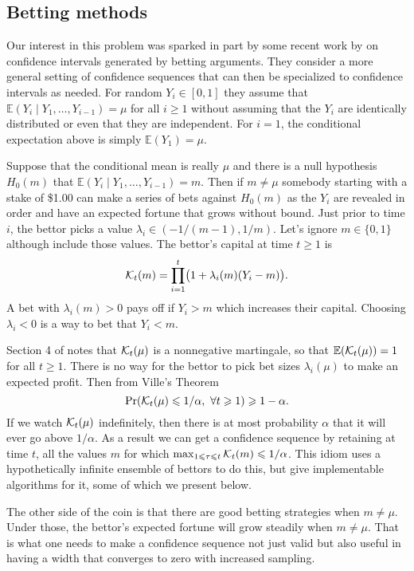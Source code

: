 \documentclass{article}
\newcommand{\art}[1]{\begingroup\color{blue}#1\endgroup}
\renewcommand{\le}{\leqslant}
\renewcommand{\ge}{\geqslant}
\newcommand{\e}{\mathbb{E}}
\newcommand{\giv}{\!\mid\!} %
\begin{document}


\subsection{Betting methods}

Our interest in this problem was sparked in part by some recent
work by \cite{WauRam24a} on confidence intervals generated
by betting arguments.  They consider a more general setting
of confidence sequences that can then be specialized to
confidence intervals as needed.  
For random $Y_i\in[0,1]$ they assume
that $\e(Y_i\giv Y_1,\dots,Y_{i-1})=\mu$ for all $i\ge1$ 
without assuming
that the $Y_i$ are identically distributed or even that
they are independent. For $i=1$, the conditional expectation 
above is simply $\e(Y_1)=\mu$.

Suppose that the conditional mean is really $\mu$ and 
there is a null hypothesis $H_0(m)$ that
$\e(Y_i\giv Y_1,\dots, Y_{i-1})=m$. Then if $m\ne\mu$
somebody starting with a stake of \$1.00 can
make a series of bets against $H_0(m)$
as the $Y_i$ are revealed in order
and have an expected fortune that grows without bound.
Just prior to time $i$, the bettor picks a value
$\lambda_i\in(-1/(m-1),1/m)$. Let's ignore $m\in\{0,1\}$
although \cite{WauRam24a} include those values. The bettor's
capital at time $t\ge1$ is
$$
\mathcal{K}_t(m)= \prod_{i=1}^t\bigl(1+\lambda_i(m)(Y_i-m)\bigr).
$$
A bet with $\lambda_i(m)>0$ pays off if $Y_i>m$ which
increases their capital. Choosing $\lambda_i<0$ is a 
way to bet that $Y_i<m$.

Section 4 of \cite{WauRam24a} notes that $\mathcal{K}_t(\mu)$ is
a \art{nonnegative} martingale, so that $\e(\ck_t(\mu))=1$ for all $t\ge1$.
There is no way for the bettor to pick bet sizes $\lambda_i(\mu)$
to make an expected profit.   \art{Then from Ville's Theorem}
$$
\Pr( \ck_t(\mu)\le 1/\alpha,\ \forall t\ge1)\ge1-\alpha.
$$
If we watch $\mathcal{K}_t(\mu)$ indefinitely, then
there is at most probability $\alpha$ that it will
ever go above $1/\alpha$.  As a result we can get
a confidence sequence by retaining at time $t$,
all the values $m$ for 
which $\max_{1\le\tau\le t}\ck_t(m)\le1/\alpha$.
This idiom uses a hypothetically infinite ensemble of 
bettors to do this, but \cite{WauRam24a} give
implementable algorithms for it, some of which we present below.

The other side of the coin is that there are good betting
strategies when $m\ne\mu$.  Under those, the bettor's expected fortune
will grow steadily when $m\ne\mu$. That is what one needs
to make a confidence sequence not just valid but also useful
in having a width that converges to zero with increased sampling.
\end{document}
